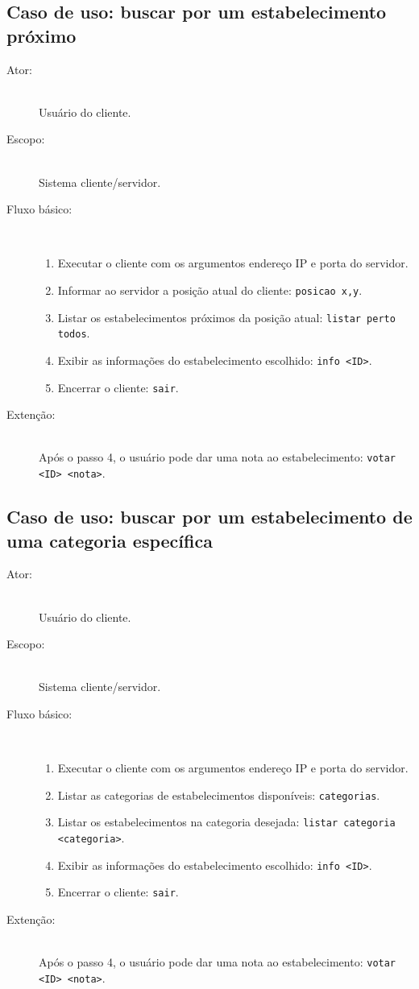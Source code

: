 \documentclass[a4paper,10pt,oneside,final,titlepage,onecolumn]{scrartcl}
\begin{document}
\subsection{Caso de uso: buscar por um estabelecimento próximo}
\begin{description}
 \item[Ator:] \hfill \\ Usuário do cliente.
 \item[Escopo:] \hfill \\ Sistema cliente/servidor.
 \item[Fluxo básico:] \hfill \\
 \begin{enumerate}
  \item Executar o cliente com os argumentos endereço IP e porta do servidor.
  \item Informar ao servidor a posição atual do cliente: \verb|posicao x,y|.
  \item Listar os estabelecimentos próximos da posição atual: \verb|listar perto todos|.
  \item Exibir as informações do estabelecimento escolhido: \verb|info <ID>|.
  \item Encerrar o cliente: \verb|sair|.
 \end{enumerate}
 \item[Extenção:] \hfill \\ Após o passo 4, o usuário pode dar uma nota ao estabelecimento: \verb|votar <ID> <nota>|.
\end{description}

\subsection{Caso de uso: buscar por um estabelecimento de uma categoria específica}
\begin{description}
 \item[Ator:] \hfill \\ Usuário do cliente.
 \item[Escopo:] \hfill \\ Sistema cliente/servidor.
 \item[Fluxo básico:] \hfill \\
 \begin{enumerate}
  \item Executar o cliente com os argumentos endereço IP e porta do servidor.
  \item Listar as categorias de estabelecimentos disponíveis: \verb|categorias|.
  \item Listar os estabelecimentos na categoria desejada: \verb|listar categoria <categoria>|.
  \item Exibir as informações do estabelecimento escolhido: \verb|info <ID>|.
  \item Encerrar o cliente: \verb|sair|.
 \end{enumerate}
 \item[Extenção:] \hfill \\ Após o passo 4, o usuário pode dar uma nota ao estabelecimento: \verb|votar <ID> <nota>|.
\end{description}
\end{document}

